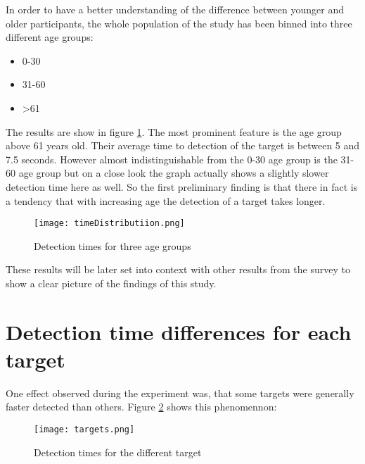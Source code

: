             In order to have a better understanding of the difference between younger and older participants, the whole population of the study has been binned into three different age groups:

            \begin{itemize}
                \item 0-30
                \item 31-60
                \item >61
            \end{itemize}

            The results are show in figure \ref*{age-groups}. The most prominent feature is the age group above 61 years old. Their average time to detection of the target is between 5 and 7.5 seconds. However almost indistinguishable from the 0-30 age group is the 31-60 age group but on a close look the graph actually shows a slightly slower detection time here as well. So the first preliminary finding is that there in fact is a tendency that with increasing age the detection of a target takes longer.

            \begin{figure}[h]     %
                \centering
                \texttt{[image: timeDistributiion.png]} 
                \caption{Detection times for three age groups}\label{age-groups}
            \end{figure}

            These results will be later set into context with other results from the survey to show a clear picture of the findings of this study.

        \section{Detection time differences for each target}

            One effect observed during the experiment was, that some targets were generally faster detected than others. Figure \ref*{targets} shows this phenomennon:

            \begin{figure}[h]     %
                \centering
                \texttt{[image: targets.png]} 
                \caption{Detection times for the different target}\label{targets}
            \end{figure}

